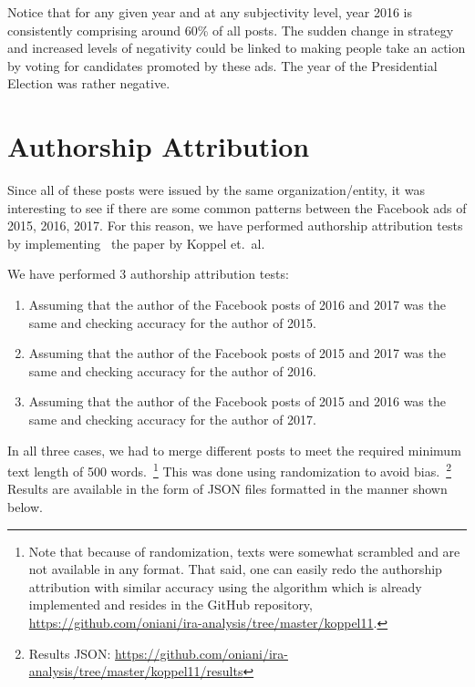 \documentclass[12pt]{article}
\theoremstyle{definition}
\begin{document}
\bigskip

Notice that for any given year and at any subjectivity level, year 2016 is
consistently comprising around 60\% of all posts. The sudden change in
strategy and increased levels of negativity could be linked to making people
take an action by voting for candidates promoted by these ads. The year of the
Presidential Election was rather negative.


\section*{\centering Authorship Attribution}

Since all of these posts were issued by the same organization/entity, it was
interesting to see if there are some common patterns between the Facebook ads
of 2015, 2016, 2017. For this reason, we have performed authorship attribution
tests by implementing~\cite{koppel11} the paper by Koppel et.~al.

\bigskip

We have performed 3 authorship attribution tests:

\begin{enumerate}
  \item Assuming that the author of the Facebook posts of 2016 and 2017 was the
        same and checking accuracy for the author of 2015.

  \item Assuming that the author of the Facebook posts of 2015 and 2017 was the
        same and checking accuracy for the author of 2016.

  \item Assuming that the author of the Facebook posts of 2015 and 2016 was the
        same and checking accuracy for the author of 2017.
\end{enumerate}

In all three cases, we had to merge different posts to meet the required
minimum text length of 500 words.~\footnote{Note that because of randomization,
texts were somewhat scrambled and are not available in any format. That said,
one can easily redo the authorship attribution with similar accuracy using the
algorithm which is already implemented and resides in the GitHub repository,
\url{https://github.com/oniani/ira-analysis/tree/master/koppel11}.} This was
done using randomization to avoid bias.~\footnote{Results JSON:
\url{https://github.com/oniani/ira-analysis/tree/master/koppel11/results}}
Results are available in the form of JSON files formatted in the manner shown
below.
\end{document}
